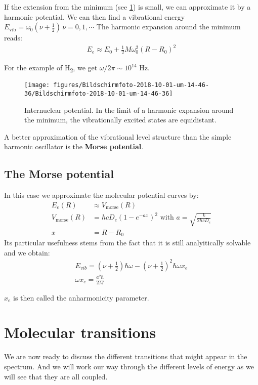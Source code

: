 \documentclass[10pt]{article}
\begin{document}
If the extension from the minimum (see \ref{584527}) is small, we can approximate it by a harmonic potential.
%
We can then find a vibrational energy $E_\text{vib} = \omega_0 (\nu+\frac{1}{2})\, \nu=0,1,\cdots$
%
The harmonic expansion around the minimum reads:
\begin{align}
E_e \approx E_0 + \frac{1}{2} M \omega_0^2 (R-R_0 )^2
\end{align}

For the example of H\textsubscript{2}, we get $\omega/2\pi \sim 10^{14}$ Hz.
\begin{figure}[h!]
\begin{center}
\texttt{[image: figures/Bildschirmfoto-2018-10-01-um-14-46-36/Bildschirmfoto-2018-10-01-um-14-46-36]}
\caption{{Internuclear potential. In the limit of a harmonic expansion around the
minimum, the vibrationally excited states are equidistant.
{\label{584527}}%
}}
\end{center}
\end{figure}

A better approximation of the vibrational level structure than the simple harmonic oscillator is the \textbf{Morse potential}. 
\subsection{The Morse potential}

In this case we approximate the molecular potential curves by:
\begin{align}
E_e(R) &\approx V_\text{morse}(R)\\
V_\text{morse}(R) &=hcD_e(1-e^{-ax})^2\text{ with }a =\sqrt{\frac{k}{2hcD_e}}\\
x &= R-R_0
\end{align}
Its particular usefulness stems from the fact that it is still analyitically solvable and we obtain:
\begin{align}
E_{vib}=(\nu+\frac{1}{2})\hbar \omega-(\nu+\frac{1}{2})^2 \hbar \omega x_e\\
\omega x_e = \frac{a^2\hbar}{2M}
\end{align}

$x_e$ is then called the anharmonicity parameter.

\section{Molecular transitions}
We are now ready to discuss the different transitions that might appear in the spectrum. And we will work our way through the different levels of energy as we will see that they are all coupled.
\end{document}
